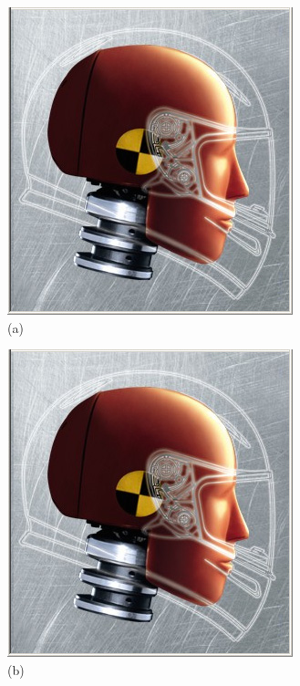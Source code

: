 \documentclass[sponsored]{acmsiggraph}
\begin{document}
\begin{figure}[t]
    \centering
    \parbox{0.3\linewidth}{\centering \includegraphics[width=\linewidth]{images/Dummy} \\ (a)}
    \parbox{0.3\linewidth}{\centering \includegraphics[width=\linewidth]{images/Dummy} \\ (b)}

\end{figure}
\end{document}
